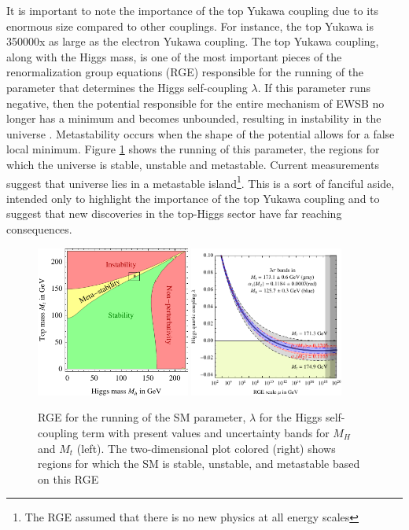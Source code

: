 It is important to note the importance of the top Yukawa coupling
due to its enormous size compared to other couplings. For instance, the top Yukawa is 350000x as large as the electron
Yukawa coupling. The top Yukawa coupling,
along with the Higgs mass, is one of the most important pieces of the renormalization group equations (RGE)
responsible for the running of the parameter that determines the Higgs self-coupling $\lambda$. 
If this parameter runs negative, then the potential responsible for the entire mechanism 
of EWSB no longer has a minimum and becomes unbounded, resulting in instability in the universe \cite{Degrassi:2012ry}.
Metastability occurs when the shape of the potential allows for a false local minimum.
Figure \ref{figure:theory_stability} shows the running of this parameter, the regions
for which the universe is stable, unstable and metastable. Current
measurements suggest that universe lies in a metastable island\footnote{The
RGE assumed that there is no new physics at all energy scales}. This is a sort of fanciful
aside, intended only to highlight the importance of the top Yukawa coupling and to suggest that
new discoveries in the top-Higgs sector have far reaching consequences. 


\begin{figure}[!t]
\centering 
\includegraphics[width=0.45\textwidth]{figs/theory/SMstability.pdf}
\includegraphics[width=0.45\textwidth]{figs/theory/runLambda.pdf}
\caption {
  RGE for the running of the SM parameter, $\lambda$ for the Higgs self-coupling term 
  with present values and uncertainty bands for $M_H$ and $M_t$ (left). The two-dimensional
  plot colored (right) shows regions for which the SM is stable, unstable, and metastable
  based on this RGE}

\label{figure:theory_stability}

\end{figure}


